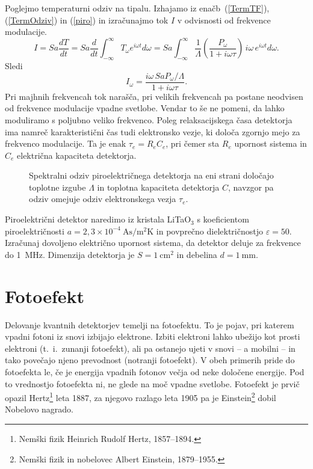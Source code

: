 Poglejmo temperaturni odziv na tipalu. Izhajamo iz enačb~(\ref{TermTF}), (\ref{TermOdziv}) in
(\ref{piro}) in izračunajmo tok $I$ v odvisnosti od frekvence modulacije.
\begin{equation}
I = Sa \frac{dT}{dt} = Sa \frac{d}{dt} \int_{-\infty}^{\infty} T_\omega e^{i\omega t}d\omega 
=Sa\int_{-\infty}^{\infty}\frac{1}{\Lambda}\left(\frac{P_\omega}{1+i \omega \tau}\right) \,i \omega\,
e^{i\omega t}d\omega.
\end{equation}
Sledi 
\begin{equation}
I_\omega = \frac{i \omega\, SaP_\omega/\Lambda}{1 + i \omega \tau}.
\end{equation}
Pri majhnih frekvencah tok narašča, pri velikih frekvencah pa postane neodvisen od
frekvence modulacije vpadne svetlobe. Vendar to še ne pomeni, da lahko moduliramo s poljubno 
veliko frekvenco. Poleg relaksacijskega časa detektorja ima namreč karakteristični čas tudi
elektronsko vezje, ki določa zgornjo mejo za frekvenco modulacije. 
Ta je enak $\tau_e = R_eC_e$, pri čemer
sta $R_e$ upornost sistema in $C_e$ električna kapaciteta detektorja. 
\begin{figure}[h]
\centering
\def\svgwidth{90truemm} 

\caption{Spektralni odziv piroelektričnega detektorja na eni strani določajo toplotne izgube 
$\Lambda$ in toplotna kapaciteta detektorja $C$, navzgor pa odziv omejuje odziv elektronskega vezja $\tau_e$.}
\label{fig:Piro}
\end{figure}

\begin{definition}
Piroelektrični detektor naredimo iz kristala LiTaO$_3$ 
s koeficientom piroelektričnosti
$a = 2,3 \times 10^{-4}~\si{\ampere \second /\metre^2 \kelvin}$ in povprečno 
dielektričnostjo $\varepsilon = 50$. Izračunaj dovoljeno električno upornost sistema, 
da detektor deluje za frekvence do 1~MHz. 
Dimenzija detektorja je $S = 1~\si{\centi\metre^2}$ in debelina $d = 1~\si{\milli\metre}$.
\end{definition}

\section{Fotoefekt}
Delovanje kvantnih detektorjev temelji na fotoefektu. 
To je pojav, pri katerem vpadni
fotoni iz snovi izbijajo elektrone. Izbiti elektroni lahko ubežijo kot prosti elektroni
(t.\ i.\ zunanji fotoefekt),
ali pa ostanejo ujeti v snovi -- a mobilni -- in tako povečajo 
njeno prevodnost (notranji fotoefekt). 
V obeh primerih pride do fotoefekta le, 
če je energija vpadnih fotonov večja od neke določene energije.
Pod to vrednostjo fotoefekta ni, ne glede na moč vpadne svetlobe.
Fotoefekt je prvič opazil Hertz\footnote{Nemški fizik Heinrich Rudolf Hertz, 1857--1894.} 
leta 1887, za njegovo razlago leta
1905 pa je Einstein\footnote{Nemški fizik in nobelovec Albert Einstein, 1879--1955.} 
dobil Nobelovo nagrado. 


